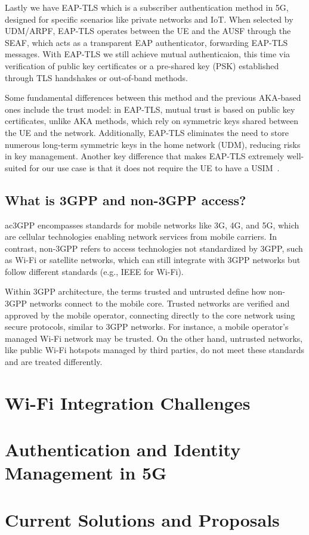 Lastly we have \ac{EAP-TLS} which is a subscriber authentication method in \ac{5G}, designed for specific scenarios like private networks and \ac{IoT}. When selected by \ac{UDM}/\ac{ARPF}, \ac{EAP-TLS} operates between the \ac{UE} and the \ac{AUSF} through the \ac{SEAF}, which acts as a transparent \ac{EAP} authenticator, forwarding \ac{EAP-TLS} messages. With \ac{EAP-TLS} we still achieve mutual authenticaion, this time via verification of public key certificates or a pre-shared key (\ac{PSK}) established through \ac{TLS} handshakes or out-of-band methods.

Some fundamental differences between this method and the previous AKA-based ones include the trust model: in \ac{EAP-TLS}, mutual trust is based on public key certificates, unlike AKA methods, which rely on symmetric keys shared between the \ac{UE} and the network. Additionally, \ac{EAP-TLS} eliminates the need to store numerous long-term symmetric keys in the home network (\ac{UDM}), reducing risks in key management. Another key difference that makes \ac{EAP-TLS} extremely well-suited for our use case is that it does not require the \ac{UE} to have a \ac{USIM}~\cite{cbl-comp-4g-5g-p12}.

\subsection{What is \ac{3GPP} and non-\ac{3GPP} access?}

ac{3GPP} encompasses standards for mobile networks like \ac{3G}, \ac{4G}, and \ac{5G}, which are cellular technologies enabling network services from mobile carriers. In contrast, non-\ac{3GPP} refers to access technologies not standardized by \ac{3GPP}, such as Wi-Fi or satellite networks, which can still integrate with \ac{3GPP} networks but follow different standards (e.g., IEEE for Wi-Fi).

Within \ac{3GPP} architecture, the terms trusted and untrusted define how non-\ac{3GPP} networks connect to the mobile core. Trusted networks are verified and approved by the mobile operator, connecting directly to the core network using secure protocols, similar to \ac{3GPP} networks. For instance, a mobile operator’s managed Wi-Fi network may be trusted. On the other hand, untrusted networks, like public Wi-Fi hotspots managed by third parties, do not meet these standards and are treated differently.

\section{Wi-Fi Integration Challenges}

\section{Authentication and Identity Management in \acs{5G}}


\section{Current Solutions and Proposals}